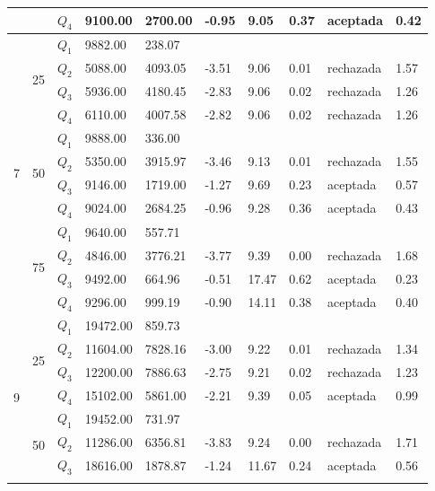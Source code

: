 \begin{table}[]
\begin{tabular}{|l|l|l|l|l|l|l|l|l|l|}
 &  & $Q_4$ & 9100.00 & 2700.00 & -0.95 & 9.05 & 0.37 & aceptada & 0.42 \\ \hline
\multirow{12}{*}{7} & \multirow{4}{*}{25} & $Q_1$ & 9882.00 & 238.07 & \multicolumn{5}{l|}{} \\ \cline{3-10} 
 &  & $Q_2$ & 5088.00 & 4093.05 & -3.51 & 9.06 & 0.01 & rechazada & 1.57 \\ \cline{3-10} 
 &  & $Q_3$ & 5936.00 & 4180.45 & -2.83 & 9.06 & 0.02 & rechazada & 1.26 \\ \cline{3-10} 
 &  & $Q_4$ & 6110.00 & 4007.58 & -2.82 & 9.06 & 0.02 & rechazada & 1.26 \\ \cline{2-10} 
 & \multirow{4}{*}{50} & $Q_1$ & 9888.00 & 336.00 & \multicolumn{5}{l|}{} \\ \cline{3-10} 
 &  & $Q_2$ & 5350.00 & 3915.97 & -3.46 & 9.13 & 0.01 & rechazada & 1.55 \\ \cline{3-10} 
 &  & $Q_3$ & 9146.00 & 1719.00 & -1.27 & 9.69 & 0.23 & aceptada & 0.57 \\ \cline{3-10} 
 &  & $Q_4$ & 9024.00 & 2684.25 & -0.96 & 9.28 & 0.36 & aceptada & 0.43 \\ \cline{2-10} 
 & \multirow{4}{*}{75} & $Q_1$ & 9640.00 & 557.71 & \multicolumn{5}{l|}{} \\ \cline{3-10} 
 &  & $Q_2$ & 4846.00 & 3776.21 & -3.77 & 9.39 & 0.00 & rechazada & 1.68 \\ \cline{3-10} 
 &  & $Q_3$ & 9492.00 & 664.96 & -0.51 & 17.47 & 0.62 & aceptada & 0.23 \\ \cline{3-10} 
 &  & $Q_4$ & 9296.00 & 999.19 & -0.90 & 14.11 & 0.38 & aceptada & 0.40 \\ \hline
\multirow{12}{*}{9} & \multirow{4}{*}{25} & $Q_1$ & 19472.00 & 859.73 & \multicolumn{5}{l|}{} \\ \cline{3-10} 
 &  & $Q_2$ & 11604.00 & 7828.16 & -3.00 & 9.22 & 0.01 & rechazada & 1.34 \\ \cline{3-10} 
 &  & $Q_3$ & 12200.00 & 7886.63 & -2.75 & 9.21 & 0.02 & rechazada & 1.23 \\ \cline{3-10} 
 &  & $Q_4$ & 15102.00 & 5861.00 & -2.21 & 9.39 & 0.05 & aceptada & 0.99 \\ \cline{2-10} 
 & \multirow{4}{*}{50} & $Q_1$ & 19452.00 & 731.97 & \multicolumn{5}{l|}{} \\ \cline{3-10} 
 &  & $Q_2$ & 11286.00 & 6356.81 & -3.83 & 9.24 & 0.00 & rechazada & 1.71 \\ \cline{3-10} 
 &  & $Q_3$ & 18616.00 & 1878.87 & -1.24 & 11.67 & 0.24 & aceptada & 0.56 \\ \cline{3-10} 

\end{tabular}
\end{table}
